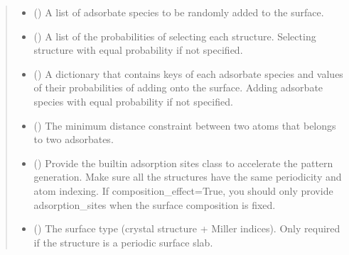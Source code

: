 \documentclass[letterpaper,10pt,english]{sphinxmanual}
\begin{document}
\begin{fulllineitems}
\begin{quote}
\begin{description}
\begin{itemize}
\item {} 
 () \textendash{} A list of adsorbate species to be randomly added to the surface.

\item {} 
 (\sphinxstyleliteralemphasis{\sphinxupquote{, }}) \textendash{} A list of the probabilities of selecting each structure.
Selecting structure with equal probability if not specified.

\item {} 
 (\sphinxstyleliteralemphasis{\sphinxupquote{, }}) \textendash{} A dictionary that contains keys of each adsorbate species and
values of their probabilities of adding onto the surface.
Adding adsorbate species with equal probability if not specified.

\item {} 
 (\sphinxstyleliteralemphasis{\sphinxupquote{, }}) \textendash{} The minimum distance constraint between two atoms that belongs
to two adsorbates.

\item {} 
 (\sphinxstyleliteralemphasis{\sphinxupquote{, }}) \textendash{} Provide the built\sphinxhyphen{}in adsorption sites class to accelerate the
pattern generation. Make sure all the structures have the same
periodicity and atom indexing. If composition\_effect=True, you
should only provide adsorption\_sites when the surface composition
is fixed.

\item {} 
 (\sphinxstyleliteralemphasis{\sphinxupquote{, }}) \textendash{} The surface type (crystal structure + Miller indices).
Only required if the structure is a periodic surface slab.


\end{itemize}
\end{description}
\end{quote}
\end{fulllineitems}
\end{document}
